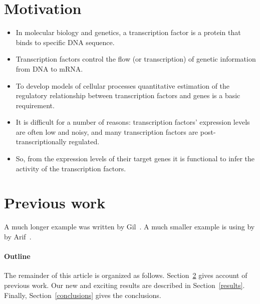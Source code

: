 \documentclass[12pt]{article}
\begin{document}
\maketitle


\section{Motivation}
	\begin{itemize}

	  \item In molecular biology and genetics, a transcription factor is a protein that binds to specific DNA sequence.
	  \item Transcription factors control the flow (or transcription) of genetic information from DNA to mRNA. 
	  \item To develop models of cellular processes quantitative estimation of the regulatory relationship between transcription factors and genes is a basic requirement. 
	  \item It is difficult for a number of reasons: transcription factors’ expression levels are often low and noisy, and many transcription factors are post- transcriptionally regulated. 
	  \item So, from the expression levels of their target genes it is functional to infer the activity of the transcription factors.

	\end{itemize}

\section{Previous work}\label{previous work}
A much longer \LaTeXe{} example was written by Gil~\cite{Gil:02}.
A much smaller \LaTeXe{} example is using by by Arif~\cite{Arif:01}.

	
\paragraph{Outline}
The remainder of this article is organized as follows.
Section~\ref{previous work} gives account of previous work.
Our new and exciting results are described in Section~\ref{results}.
Finally, Section~\ref{conclusions} gives the conclusions.
\end{document}
